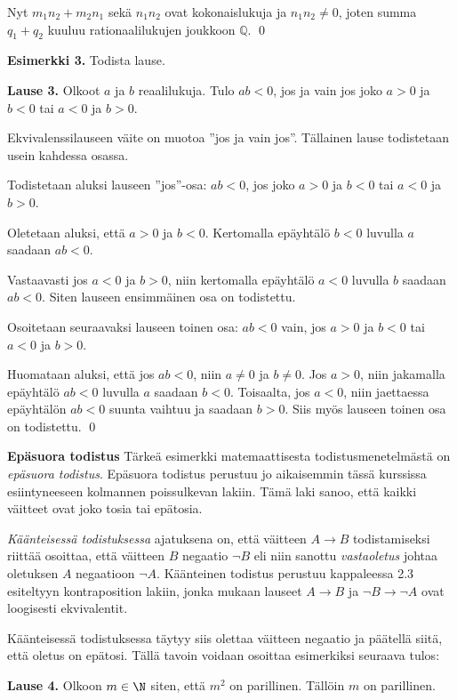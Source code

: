 Nyt $m_1n_2 + m_2 n_1$ sekä $n_1 n_2$ ovat kokonaislukuja ja $n_1 n_2\neq 0$, joten summa $q_1+q_2$ kuuluu rationaalilukujen joukkoon $\mathbb{Q}$.
\qed

{\bf Esimerkki 3.} Todista lause.

{\bf Lause 3.} Olkoot $a$ ja $b$ reaalilukuja. Tulo $ab<0$, jos ja vain jos joko $a>0$ ja $b<0$ tai $a<0$ ja $b>0$.

\proof
Ekvivalenssilauseen väite on muotoa ''jos ja vain jos''. Tällainen lause todistetaan usein kahdessa osassa.

Todistetaan aluksi lauseen ''jos''-osa: $ab<0$, jos joko $a>0$ ja $b<0$ tai $a<0$ ja $b>0$.

Oletetaan aluksi, että $a>0$ ja $b<0$. Kertomalla epäyhtälö $b<0$ luvulla $a$ saadaan $ab<0$.

Vastaavasti jos $a<0$ ja $b>0$, niin kertomalla epäyhtälö $a<0$ luvulla $b$ saadaan $ab<0$. Siten lauseen ensimmäinen osa on todistettu.

Osoitetaan seuraavaksi lauseen toinen osa: $ab<0$ vain, jos $a>0$ ja $b<0$ tai $a<0$ ja $b>0$.

Huomataan aluksi, että jos $ab<0$, niin $a\neq 0$ ja $b\neq 0$. Jos $a>0$, niin jakamalla epäyhtälö $ab<0$ luvulla $a$ saadaan $b<0$. Toisaalta, jos $a<0$, niin jaettaessa epäyhtälön $ab<0$ suunta vaihtuu ja saadaan $b>0$. Siis myös lauseen toinen osa on todistettu.
\qed

{\bf Epäsuora todistus}
Tärkeä esimerkki matemaattisesta todistusmenetelmästä on {\em epäsuora todistus}. Epäsuora todistus perustuu jo aikaisemmin tässä kurssissa esiintyneeseen kolmannen poissulkevan lakiin. Tämä laki sanoo, että kaikki väitteet ovat joko tosia tai epätosia.

{\em Käänteisessä todistuksessa} ajatuksena on, että väitteen $A\to B$ todistamiseksi riittää osoittaa, että väitteen $B$ negaatio $\lnot B$ eli niin sanottu {\em vastaoletus} johtaa oletuksen $A$ negaatioon $\lnot A$. Käänteinen todistus perustuu kappaleessa 2.3 esiteltyyn kontraposition lakiin, jonka mukaan lauseet $A\to B$ ja $\lnot B \to \lnot A$ ovat loogisesti ekvivalentit. 

Käänteisessä todistuksessa täytyy siis olettaa väitteen negaatio ja päätellä siitä, että oletus on epätosi. Tällä tavoin voidaan osoittaa esimerkiksi seuraava tulos:

{\bf Lause 4.} Olkoon $m\in \N$ siten, että $m^2$ on parillinen. Tällöin $m$ on parillinen.

